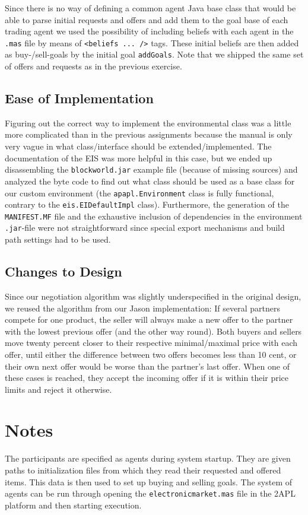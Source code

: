 \documentclass[a4paper,11pt]{article}
\begin{document}
Since there is no way of defining a common agent Java base class that would be able to parse initial requests and offers and add them to the goal base of each trading agent we used the possibility of including beliefs with each agent in the \texttt{.mas} file by means of \texttt{<beliefs ... />} tags. These initial beliefs are then added as buy-/sell-goals by the initial goal \texttt{addGoals}. Note that we shipped the same set of offers and requests as in the previous exercise.

\subsection{Ease of Implementation}
Figuring out the correct way to implement the environmental class was a little more complicated than in the previous assignments because the manual is only very vague in what class/interface should be extended/implemented. The documentation of the EIS was more helpful in this case, but we ended up disassembling the \texttt{blockworld.jar} example file (because of missing sources) and analyzed the byte code to find out what class should be used as a base class for our custom environment (the \texttt{apapl.Environment} class is fully functional, contrary to the \texttt{eis.EIDefaultImpl} class). Furthermore, the generation of the \texttt{MANIFEST.MF} file and the exhaustive inclusion of dependencies in the environment \texttt{.jar}-file were not straightforward since special export mechanisms and build path settings had to be used. 

\subsection{Changes to Design}
Since our negotiation algorithm was slightly underspecified in the original design, we reused the algorithm from our Jason implementation: If several partners compete for one product, the seller will always make a new offer to the partner with the lowest previous offer (and the other way round). Both buyers and sellers move twenty percent closer to their respective minimal/maximal price with each offer, until either the difference between two offers becomes less than 10 cent, or their own next offer would be worse than the partner's last offer. When one of these cases is reached, they accept the incoming offer if it is within their price limits and reject it otherwise.

\section{Notes}
The participants are specified as agents during system startup. They are given paths to initialization files from which they read their requested and offered items. This data is then used to set up buying and selling goals. The system of agents can be run through opening the \texttt{electronicmarket.mas} file in the 2APL platform and then starting execution.
\end{document}
